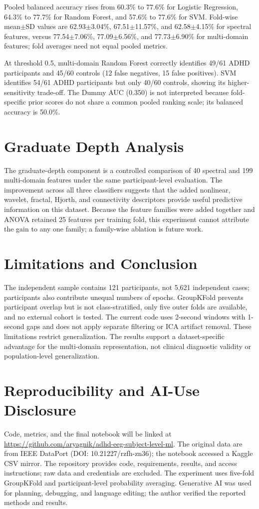\documentclass{article}
\begin{document}
Pooled balanced accuracy rises from 60.3\% to 77.6\% for Logistic Regression, 64.3\% to 77.7\% for Random Forest, and 57.6\% to 77.6\% for SVM. Fold-wise mean$\pm$SD values are 62.93$\pm$3.04\%, 67.51$\pm$11.57\%, and 62.58$\pm$4.15\% for spectral features, versus 77.54$\pm$7.06\%, 77.09$\pm$6.56\%, and 77.73$\pm$6.90\% for multi-domain features; fold averages need not equal pooled metrics.

At threshold 0.5, multi-domain Random Forest correctly identifies 49/61 ADHD participants and 45/60 controls (12 false negatives, 15 false positives). SVM identifies 54/61 ADHD participants but only 40/60 controls, showing its higher-sensitivity trade-off. The Dummy AUC (0.350) is not interpreted because fold-specific prior scores do not share a common pooled ranking scale; its balanced accuracy is 50.0\%.

\section{Graduate Depth Analysis}
The graduate-depth component is a controlled comparison of 40 spectral and 199 multi-domain features under the same participant-level evaluation. The improvement across all three classifiers suggests that the added nonlinear, wavelet, fractal, Hjorth, and connectivity descriptors provide useful predictive information on this dataset. Because the feature families were added together and ANOVA retained 25 features per training fold, this experiment cannot attribute the gain to any one family; a family-wise ablation is future work.

\section{Limitations and Conclusion}
The independent sample contains 121 participants, not 5,621 independent cases; participants also contribute unequal numbers of epochs. GroupKFold prevents participant overlap but is not class-stratified, only five outer folds are available, and no external cohort is tested. The current code uses 2-second windows with 1-second gaps and does not apply separate filtering or ICA artifact removal. These limitations restrict generalization. The results support a dataset-specific advantage for the multi-domain representation, not clinical diagnostic validity or population-level generalization.

\section{Reproducibility and AI-Use Disclosure}
Code, metrics, and the final notebook will be linked at \url{https://github.com/aryagnik/adhd-eeg-subject-level-ml}. The original data are from IEEE DataPort (DOI: 10.21227/rzfh-zn36); the notebook accessed a Kaggle CSV mirror. The repository provides code, requirements, results, and access instructions; raw data and credentials are excluded. The experiment uses five-fold GroupKFold and participant-level probability averaging. Generative AI was used for planning, debugging, and language editing; the author verified the reported methods and results.



\end{document}
